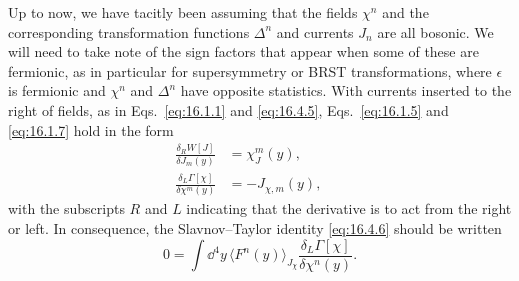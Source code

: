 Up to now, we have tacitly been assuming that the fields $\chi^n$ and the corresponding transformation functions $\Delta^n$ and currents $J_n$ are all bosonic. We will need to take note of the sign factors that appear when some of these are fermionic, as in particular for supersymmetry or BRST transformations, where $\epsilon$ is fermionic and $\chi^n$ and $\Delta^n$ have opposite statistics. With currents inserted to the right of fields, as in Eqs.~\eqref{eq:16.1.1} and \eqref{eq:16.4.5}, Eqs.~\eqref{eq:16.1.5} and \eqref{eq:16.1.7} hold in the form
\begin{align}
\frac{\delta_R W[J]}{\delta J_m(y)}&=\chi_J^m(y),
&&\tag{16.4.10}\label{eq:16.4.10}\\
\frac{\delta_L\Gamma[\chi]}{\delta\chi^m(y)}&=-J_{\chi,m}(y),
&&\tag{16.4.11}\label{eq:16.4.11}
\end{align}
with the subscripts $R$ and $L$ indicating that the derivative is to act from the right or left. In consequence, the Slavnov--Taylor identity \eqref{eq:16.4.6} should be written
\begin{equation}
0=\int \dd^4y\,\langle F^n(y)\rangle_{J_\chi}
\frac{\delta_L\Gamma[\chi]}{\delta\chi^n(y)}.
\tag{16.4.12}\label{eq:16.4.12}
\end{equation}
